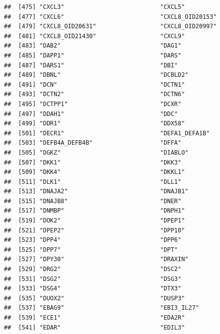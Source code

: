 \documentclass[
]{article}
\begin{document}
\begin{verbatim}
##  [475] "CXCL3"                           "CXCL5"                          
##  [477] "CXCL6"                           "CXCL8_OID20153"                 
##  [479] "CXCL8_OID20631"                  "CXCL8_OID20997"                 
##  [481] "CXCL8_OID21430"                  "CXCL9"                          
##  [483] "DAB2"                            "DAG1"                           
##  [485] "DAPP1"                           "DARS"                           
##  [487] "DARS1"                           "DBI"                            
##  [489] "DBNL"                            "DCBLD2"                         
##  [491] "DCN"                             "DCTN1"                          
##  [493] "DCTN2"                           "DCTN6"                          
##  [495] "DCTPP1"                          "DCXR"                           
##  [497] "DDAH1"                           "DDC"                            
##  [499] "DDR1"                            "DDX58"                          
##  [501] "DECR1"                           "DEFA1_DEFA1B"                   
##  [503] "DEFB4A_DEFB4B"                   "DFFA"                           
##  [505] "DGKZ"                            "DIABLO"                         
##  [507] "DKK1"                            "DKK3"                           
##  [509] "DKK4"                            "DKKL1"                          
##  [511] "DLK1"                            "DLL1"                           
##  [513] "DNAJA2"                          "DNAJB1"                         
##  [515] "DNAJB8"                          "DNER"                           
##  [517] "DNMBP"                           "DNPH1"                          
##  [519] "DOK2"                            "DPEP1"                          
##  [521] "DPEP2"                           "DPP10"                          
##  [523] "DPP4"                            "DPP6"                           
##  [525] "DPP7"                            "DPT"                            
##  [527] "DPY30"                           "DRAXIN"                         
##  [529] "DRG2"                            "DSC2"                           
##  [531] "DSG2"                            "DSG3"                           
##  [533] "DSG4"                            "DTX3"                           
##  [535] "DUOX2"                           "DUSP3"                          
##  [537] "EBAG9"                           "EBI3_IL27"                      
##  [539] "ECE1"                            "EDA2R"                          
##  [541] "EDAR"                            "EDIL3"                          

\end{verbatim}
\end{document}
